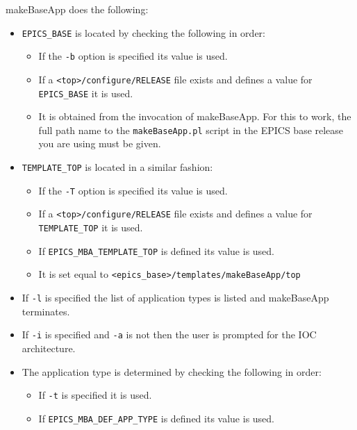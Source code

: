 makeBaseApp does the following:

\begin{itemize}
\item \verb|EPICS_BASE| is located by checking the following in order:

\begin{itemize}
\item If the \verb|-b| option is specified its value is used.

\item If a \verb|<top>/configure/RELEASE| file exists and defines a value for \verb|EPICS_BASE| it is used.

\item It is obtained from the invocation of makeBaseApp. For this to work, the full path name to the 
\verb|makeBaseApp.pl| script in the EPICS base release you are using must be given.
\end{itemize}

\item \verb|TEMPLATE_TOP| is located in a similar fashion:

\begin{itemize}
\item If the \verb|-T| option is specified its value is used.

\item If a \verb|<top>/configure/RELEASE| file exists and defines a value for \verb|TEMPLATE_TOP| it is used.

\item If \verb|EPICS_MBA_TEMPLATE_TOP| is defined its value is used.

\item It is set equal to \verb|<epics_base>/templates/makeBaseApp/top|
\end{itemize}

\item If \verb|-l| is specified the list of application types is listed and makeBaseApp terminates.

\item If \verb|-i| is specified and \verb|-a| is not then the user is prompted for the IOC architecture.

\item The application type is determined by checking the following in order:

\begin{itemize}
\item If \verb|-t| is specified it is used.

\item If \verb|EPICS_MBA_DEF_APP_TYPE| is defined its value is used.


\end{itemize}
\end{itemize}
